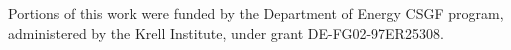 \documentclass{mc2015}
\begin{document}
Portions of this work were funded by the Department of Energy CSGF program, administered by the Krell Institute, under grant DE-FG02-97ER25308.

\setlength{\baselineskip}{12pt}




%
%
\end{document}
